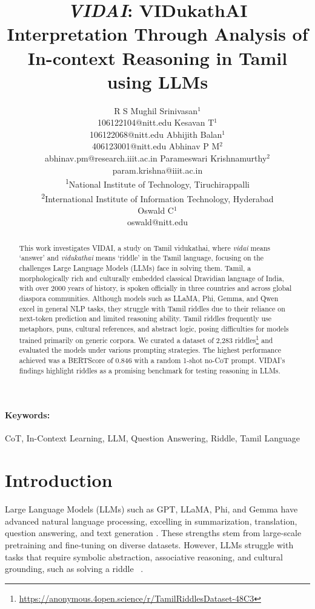 \documentclass[11pt]{article}
\title{\emph{VIDAI}: VIDukathAI Interpretation Through Analysis of In-context Reasoning in Tamil using LLMs}
\author{
R S Mughil Srinivasan$^{1}$ \\
106122104@nitt.edu 
\And
Kesavan T$^{1}$ \\
106122068@nitt.edu
\And
Abhijith Balan$^{1}$ \\
406123001@nitt.edu
\AND
Abhinav P M$^{2}$ \\
abhinav.pm@research.iiit.ac.in
\And
Parameswari Krishnamurthy$^{2}$ \\
param.krishna@iiit.ac.in
\\[0.5em]
\textsuperscript{1}National Institute of Technology, Tiruchirappalli \\
\textsuperscript{2}International Institute of Information Technology, Hyderabad \\
\And
Oswald C$^{1}$ \\
oswald@nitt.edu
}
\begin{document}
\maketitle


\begin{abstract}
This work investigates VIDAI, a study on Tamil vidukathai, where \textit{vidai} means `answer' and \textit{vidukathai} means `riddle' in the Tamil language, focusing on the challenges Large Language Models (LLMs) face in solving them. Tamil, a morphologically rich and culturally embedded classical Dravidian language of India, with over 2000 years of history, is spoken officially in three countries and across global diaspora communities. Although models such as LLaMA, Phi, Gemma, and Qwen excel in general NLP tasks, they struggle with Tamil riddles due to their reliance on next-token prediction and limited reasoning ability. Tamil riddles frequently use metaphors, puns, cultural references, and abstract logic, posing difficulties for models trained primarily on generic corpora. We curated a dataset of 2,283 riddles\footnote{\url{https://anonymous.4open.science/r/TamilRiddlesDataset-48C3}} and evaluated the models under various prompting strategies. The highest performance achieved was a BERTScore of 0.846 with a random 1-shot no-CoT prompt. VIDAI's findings highlight riddles as a promising benchmark for testing reasoning in LLMs.
\end{abstract}
\paragraph{Keywords:}  CoT, In-Context Learning, LLM, Question Answering, Riddle, Tamil Language

\section{Introduction}
Large Language Models (LLMs) such as GPT, LLaMA, Phi, and Gemma have advanced natural language processing, excelling in summarization, translation, question answering, and text generation \cite{sanchez-bayona-agerri-2025-metaphor, tong-etal-2024-metaphor, giadikiaroglou-etal-2024-puzzle, jiang-etal-2023-brainteaser}. These strengths stem from large-scale pretraining and fine-tuning on diverse datasets. However, LLMs struggle with tasks that require symbolic abstraction, associative reasoning, and cultural grounding, such as solving a riddle ~\cite{liu2024multilingualllmsculturallydiversereasoners}.
\end{document}
